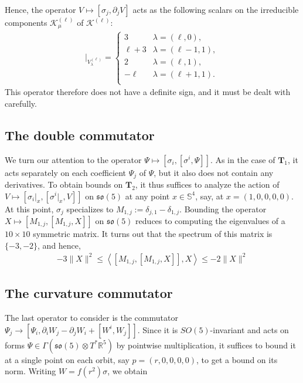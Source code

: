 \documentclass[11pt,reqno]{amsart}
\theoremstyle{remark}
\theoremstyle{definition}
\newcommand{\sov}{\mathfrak{so}(5)}
\begin{document}
Hence, the operator $V \mapsto [\sigma_j,\partial_j V]$ acts as the following scalars on the irreducible components $\mathcal K_\mu^{(\ell)}$ of $\mathcal K^{(\ell)}$:
\begin{align*}
        [\sigma_j,\partial_j (\cdot)]|_{V^{(\ell)}_{\lambda}} = \begin{cases}
        3 & \lambda = (\ell,0), \\
        \ell + 3 & \lambda = (\ell-1,1), \\
        2 & \lambda = (\ell,1), \\
        -\ell & \lambda = (\ell+1,1). \\
    \end{cases}
\end{align*}
This operator therefore does not have a definite sign, and it must be dealt with carefully.

\subsection{The double commutator}

We turn our attention to the operator $\Psi \mapsto [\sigma_i,[\sigma^i,\Psi]]$. As in the case of $\mathbf T_1$, it acts separately on each coefficient $\Psi_j$ of $\Psi$, but it also does not contain any derivatives. To obtain bounds on $\mathbf T_2$, it thus suffices to analyze the action of $V \mapsto [\sigma_i|_x,[\sigma^i|_x,V]]$ on $\sov$ at any point $x \in \mathbb S^4$, say, at $x = (1,0,0,0,0)$. At this point, $\sigma_j$ specializes to $M_{1,j} := \delta_{j,1} - \delta_{1,j}$. Bounding the operator $X \mapsto [M_{1,j},[M_{1,j},X]]$ on $\sov$ reduces to computing the eigenvalues of a $10\times 10$ symmetric matrix. It turns out that the spectrum of this matrix is $\{-3,-2\}$, and hence, 
\begin{align*}
    - 3\|X\|^2 \leq \left\langle [M_{1,j},[M_{1,j},X]], X \right\rangle \leq -2 \|X\|^2
\end{align*}

\subsection{The curvature commutator}

The last operator to consider is the commutator $\Psi_j \to [\Psi_i, \partial_iW_j-\partial_j W_i+[W^i,W_j]]$. Since it is $SO(5)$-invariant and acts on forms $\Psi \in \Gamma( \sov \otimes T^\ast \mathbb R^5)$ by pointwise multiplication, it suffices to bound it at a single point on each orbit, say $p = (r,0,0,0,0)$, to get a bound on its norm. Writing $W = f(r^2) \sigma$, we obtain
\end{document}
